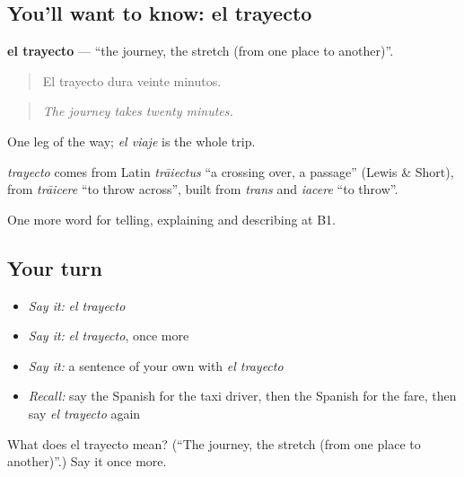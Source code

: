 \subsection*{You'll want to know: el trayecto}
\textbf{el trayecto} — \textquotedblleft{}the journey, the stretch (from one place to another)\textquotedblright{}.

\begin{quote}
El trayecto dura veinte minutos.
\end{quote}

\begin{quote}
\emph{The journey takes twenty minutes.}
\end{quote}

One leg of the way; \emph{el viaje} is the whole trip.

\begin{cousinweb}
\emph{trayecto} comes from Latin \emph{trāiectus} \textquotedblleft{}a crossing over, a passage\textquotedblright{} (Lewis \& Short), from \emph{trāicere} \textquotedblleft{}to throw across\textquotedblright{}, built from \emph{trans} and \emph{iacere} \textquotedblleft{}to throw\textquotedblright{}.
\end{cousinweb}

\begin{grammarlens}[title={What you've built}]
One more word for telling, explaining and describing at B1.
\end{grammarlens}

\subsection*{Your turn}
\begin{itemize}
\raggedright
  \item \emph{Say it:} \emph{el trayecto}
  \item \emph{Say it:} \emph{el trayecto}, once more
  \item \emph{Say it:} a sentence of your own with \emph{el trayecto}
  \item \emph{Recall:} say the Spanish for the taxi driver, then the Spanish for the fare, then say \emph{el trayecto} again
\end{itemize}

\begin{tcolorbox}[breakable,colback=teal!4,colframe=teal!35!black,title={Before you move on}]
What does el trayecto mean? (\textquotedblleft{}The journey, the stretch (from one place to another)\textquotedblright{}.) Say it once more.
\end{tcolorbox}
